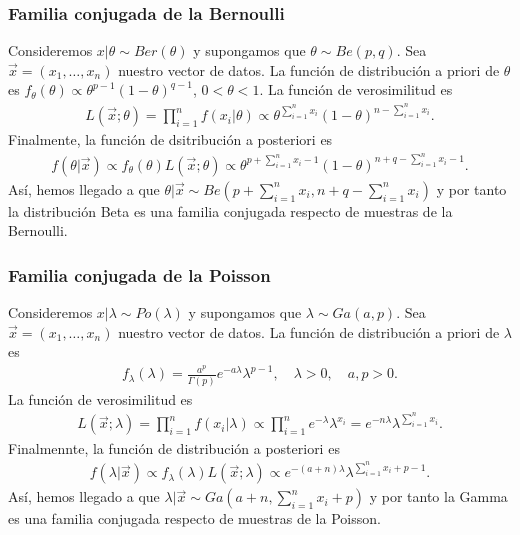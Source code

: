 \subsubsection{Familia conjugada de la Bernoulli}
Consideremos $x | \theta \sim Ber(\theta)$ y supongamos que $\theta \sim Be(p,q)$. Sea $\vec{x} = (x_1,\ldots,x_n)$ nuestro vector de datos. La función de distribución a priori de $\theta$ es $f_{\theta}(\theta) \propto \theta^{p-1}(1-\theta)^{q-1}$, $0 < \theta < 1$. La función de verosimilitud es
\begin{align*}
    L(\vec{x};\theta) = \prod_{i=1}^{n} f(x_i | \theta) \propto \theta^{\sum_{i=1}^{n} x_i}(1-\theta)^{n - \sum_{i=1}^{n} x_i}.
\end{align*}
Finalmente, la función de dsitribución a posteriori es
\begin{align*}
    f(\theta | \vec{x}) \propto f_{\theta}(\theta)L(\vec{x};\theta) \propto \theta^{p + \sum_{i=1}^{n} x_i - 1}(1 - \theta)^{n+q - \sum_{i=1}^{n} x_i -1}.
\end{align*}
Así, hemos llegado a que $\theta | \vec{x} \sim Be\left(p + \sum_{i=1}^{n} x_i, n + q - \sum_{i=1}^{n} x_i \right)$ y por tanto la distribución Beta es una familia conjugada respecto de muestras de la Bernoulli.

\subsubsection{Familia conjugada de la Poisson}
Consideremos $x | \lambda \sim Po(\lambda)$ y supongamos que $\lambda \sim Ga(a,p)$. Sea $\vec{x} = (x_1,\ldots,x_n)$ nuestro vector de datos. La función de distribución a priori de $\lambda$ es
\begin{align*}
    f_{\lambda}(\lambda) = \frac{a^p}{\Gamma(p)}e^{-a\lambda}\lambda^{p-1}, \quad \lambda > 0, \quad a,p > 0.
\end{align*}
La función de verosimilitud es
\begin{align*}
    L(\vec{x};\lambda) = \prod_{i=1}^{n} f(x_i | \lambda) \propto \prod_{i=1}^{n} e^{-\lambda} \lambda^{x_i} = e^{-n \lambda} \lambda^{\sum_{i=1}^{n} x_i}.
\end{align*}
Finalmennte, la función de distribución a posteriori es
\begin{align*}
    f(\lambda | \vec{x}) \propto f_{\lambda}(\lambda)L(\vec{x};\lambda) \propto e^{-(a+n)\lambda} \lambda^{\sum_{i=1}^{n} x_i + p - 1}.
\end{align*}
Así, hemos llegado a que $\lambda | \vec{x} \sim Ga\left(a + n, \sum_{i=1}^{n} x_i + p\right)$ y por tanto la Gamma es una familia conjugada respecto de muestras de la Poisson.


